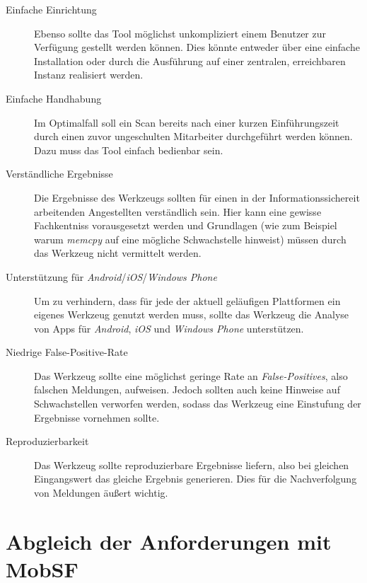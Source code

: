 \begin{description}
	\item[Einfache Einrichtung] Ebenso sollte das Tool möglichst unkompliziert einem Benutzer zur Verfügung gestellt werden können. Dies könnte entweder über eine einfache Installation oder durch die Ausführung auf einer zentralen, erreichbaren Instanz realisiert werden.
	
	\item[Einfache Handhabung] Im Optimalfall soll ein Scan bereits nach einer kurzen Einführungszeit durch einen zuvor ungeschulten Mitarbeiter durchgeführt werden können.  Dazu muss das Tool einfach bedienbar sein.
	
	\item[Verständliche Ergebnisse] Die Ergebnisse des Werkzeugs sollten für einen in der Informationssichereit arbeitenden Angestellten verständlich sein. Hier kann eine gewisse Fachkentniss vorausgesetzt werden und Grundlagen (wie zum Beispiel warum \textit{memcpy} auf eine mögliche Schwachstelle hinweist) müssen durch das Werkzeug nicht vermittelt werden.
	
	\item[Unterstützung für \textit{Android}/\textit{iOS}/\textit{Windows Phone}] Um zu verhindern, dass für jede der aktuell geläufigen Plattformen ein eigenes Werkzeug genutzt werden muss, sollte das Werkzeug die Analyse von Apps für \textit{Android}, \textit{iOS} und \textit{Windows Phone} unterstützen.
	
	\item[Niedrige False-Positive-Rate] Das Werkzeug sollte eine möglichst geringe Rate an \textit{False-Positives}, also falschen Meldungen, aufweisen. Jedoch sollten auch keine Hinweise auf Schwachstellen verworfen werden, sodass das Werkzeug eine  Einstufung der Ergebnisse vornehmen sollte.
	
	\item[Reproduzierbarkeit] Das Werkzeug sollte reproduzierbare Ergebnisse liefern, also bei gleichen Eingangswert das gleiche Ergebnis generieren. Dies für die Nachverfolgung von Meldungen äußert wichtig.
	
\end{description}





\section{Abgleich der Anforderungen mit MobSF}


